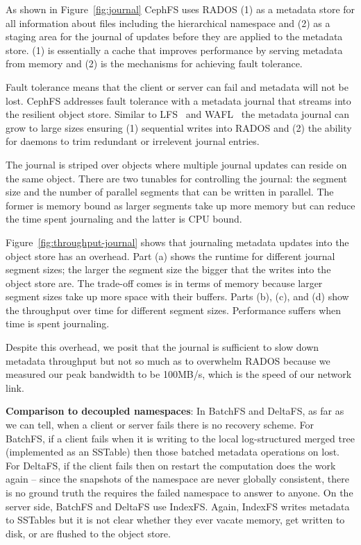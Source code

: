 As shown in Figure~\ref{fig:journal} CephFS uses RADOS (1) as a metadata store
for all information about files including the hierarchical namespace and (2) as
a staging area for the journal of updates before they are applied to the
metadata store. (1) is essentially a cache that improves performance by serving
metadata from memory and (2) is the mechanisms for achieving fault tolerance. 

Fault tolerance means that the client or server can fail and metadata will not
be lost.  CephFS addresses fault tolerance with a metadata journal that streams
into the resilient object store. Similar to LFS~\cite{} and WAFL~\cite{} the
metadata journal can grow to large sizes ensuring (1) sequential writes into
RADOS and (2) the ability for daemons to trim redundant or irrelevent journal
entries. 

The journal is striped over objects where multiple journal updates can reside
on the same object. There are two tunables for controlling the journal: the
segment size and the number of parallel segments that can be written in
parallel. The former is memory bound as larger segments take up more memory but
can reduce the time spent journaling and the latter is CPU bound. 

Figure~\ref{fig:throughput-journal} shows that journaling metadata updates into
the object store has an overhead. Part (a) shows the runtime for different
journal segment sizes; the larger the segment size the bigger that the writes
into the object store are. The trade-off comes is in terms of memory because
larger segment sizes take up more space with their buffers. Parts (b), (c), and
(d) show the throughput over time for different segment sizes. Performance
suffers when time is spent journaling. 

Despite this overhead, we posit that the journal is sufficient to slow down
metadata throughput but not so much as to overwhelm RADOS because we measured
our peak bandwidth to be 100MB/s, which is the speed of our network link.

\textbf{Comparison to decoupled namespaces}: In BatchFS and DeltaFS, as far as
we can tell, when a client or server fails there is no recovery scheme. For
BatchFS, if a client fails when it is writing to the local log-structured
merged tree (implemented as an SSTable) then those batched metadata operations
on lost. For DeltaFS, if the client fails then on restart the computation does
the work again -- since the snapshots of the namespace are never globally
consistent, there is no ground truth the requires the failed namespace to
answer to anyone. On the server side, BatchFS and DeltaFS use IndexFS. Again,
IndexFS writes metadata to SSTables but it is not clear whether they ever
vacate memory, get written to disk, or are flushed to the object store.

